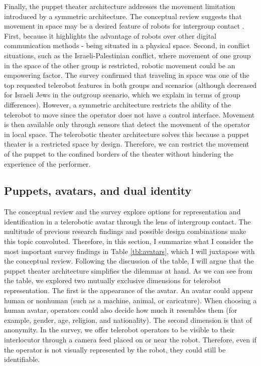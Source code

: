 \documentclass[dissertation,math,vertlayout,pdfa,colorlinks]{aaltoseries}
\begin{document}
Finally, the puppet theater architecture addresses the movement limitation introduced by a symmetric architecture. The conceptual review suggests that movement in space may be a desired feature of robots for intergroup contact \cite[p. 84]{peledTelerobotContactHypothesis2022}. First, because it highlights the advantage of robots over other digital communication methods - being situated in a physical space. Second, in conflict situations, such as the Israeli-Palestinian conflict, where movement of one group in the space of the other group is restricted, robotic movement could be an empowering factor. The survey confirmed that traveling in space was one of the top requested telerobot features in both groups and scenarios (although decreased for Israeli Jews in the outgroup scenario, which we explain in terms of group differences). However, a symmetric architecture restricts the ability of the telerobot to move since the operator does not have a control interface. Movement is then available only through sensors that detect the movement of the operator in local space. The telerobotic theater architecture solves this because a puppet theater is a restricted space by design. Therefore, we can restrict the movement of the puppet to the confined borders of the theater without hindering the experience of the performer.

\subsection{Puppets, avatars, and dual identity}
The conceptual review and the survey explore options for representation and identification in a telerobotic avatar through the lens of intergroup contact. The multitude of previous research findings and possible design combinations make this topic convoluted. Therefore, in this section, I summarize what I consider the most important survey findings in Table \ref{tbl:avatars}, which I will juxtapose with the conceptual review. Following the discussion of the table, I will argue that the puppet theater architecture simplifies the dilemmas at hand. As we can see from the table, we explored two mutually exclusive dimensions for telerobot representation. The first is the appearance of the avatar. An avatar could appear human or nonhuman (such as a machine, animal, or caricature). When choosing a human avatar, operators could also decide how much it resembles them (for example, gender, age, religion, and nationality). The second dimension is that of anonymity. In the survey, we offer telerobot operators to be visible to their interlocutor through a camera feed placed on or near the robot. Therefore, even if the operator is not visually represented by the robot, they could still be identifiable.
\end{document}
